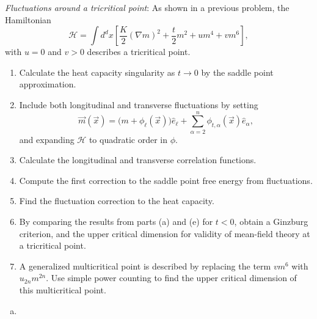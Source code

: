 \begin{problem}
    \textit{Fluctuations around a tricritical point}: As shown in a previous problem, the Hamiltonian
    \[
        \mathcal{H} = \int d^dx\left[\frac{K}{2}(\nabla m)^2 + \frac{t}{2}m^2 + um^4 + vm^6\right],
    \]
    with $u = 0$ and $v > 0$ describes a tricritical point.

    \begin{enumerate}
        \item[(a)] Calculate the heat capacity singularity as $t \to 0$ by the saddle point approximation.

        \item[(b)] Include both longitudinal and transverse fluctuations by setting
        \[
            \vec{m}(\vec{x}) = \bigl(m + \phi_\ell(\vec{x})\bigr)\hat{e}_\ell + \sum_{\alpha=2}^{n}\phi_{t,\alpha}(\vec{x})\hat{e}_\alpha,
        \]
        and expanding $\mathcal{H}$ to quadratic order in $\phi$.

        \item[(c)] Calculate the longitudinal and transverse correlation functions.

        \item[(d)] Compute the first correction to the saddle point free energy from fluctuations.

        \item[(e)] Find the fluctuation correction to the heat capacity.

        \item[(f)] By comparing the results from parts (a) and (e) for $t < 0$, obtain a Ginzburg criterion, and the upper critical dimension for validity of mean-field theory at a tricritical point.

        \item[(g)] A generalized multicritical point is described by replacing the term $vm^6$ with $u_{2n}m^{2n}$. Use simple power counting to find the upper critical dimension of this multicritical point.
    \end{enumerate}
\end{problem}

\begin{solution}
    \begin{enumerate}[(a)]
        \item
    \end{enumerate}
\end{solution}

